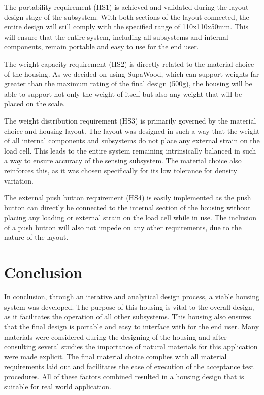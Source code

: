 \documentclass[class=report,11pt,crop=false]{standalone}
\begin{document}
The portability requirement (HS1) is achieved and validated during the layout design stage of the subsystem. With both sections of the layout connected, the entire design will still comply with the specified range of 110x110x50mm. This will ensure that the entire system, including all subsystems and internal components, remain portable and easy to use for the end user.

The weight capacity requirement (HS2) is directly related to the material choice of the housing. As we decided on using SupaWood, which can support weights far greater than the maximum rating of the final design (500g), the housing will be able to support not only the weight of itself but also any weight that will be placed on the scale.

The weight distribution requirement (HS3) is primarily governed by the material choice and housing layout. The layout was designed in such a way that the weight of all internal components and subsystems do not place any external strain on the load cell. This leads to the entire system remaining intrinsically balanced in such a way to ensure accuracy of the sensing subsystem. The material choice also reinforces this, as it was chosen specifically for its low tolerance for density variation.

The external push button requirement (HS4) is easily implemented as the push button can directly be connected to the internal section of the housing without placing any loading or external strain on the load cell while in use. The inclusion of a push button will also not impede on any other requirements, due to the nature of the layout. 

\section{Conclusion}
In conclusion, through an iterative and analytical design process, a viable housing system was developed. The purpose of this housing is vital to the overall design, as it facilitates the operation of all other subsystems. This housing also ensures that the final design is portable and easy to interface with for the end user. Many materials were considered during the designing of the housing and after consulting several studies the importance of natural materials for this application were made explicit. The final material choice complies with all material requirements laid out and facilitates the ease of execution of the acceptance test procedures. All of these factors combined resulted in a housing design that is suitable for real world application. 
	\ifstandalone
	
	\printnoidxglossary[type=\acronymtype,nonumberlist]
	\fi
	
\end{document}

